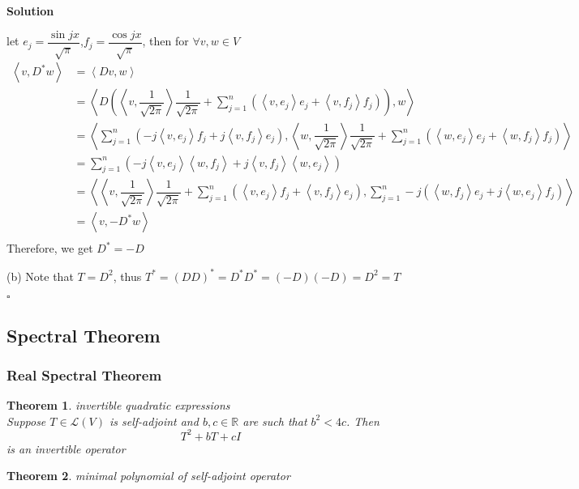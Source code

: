 \documentclass{article}
\newtheorem{theorem}{Theorem}[subsection]
\newenvironment{solution}{%
{
    \textbf{Solution\\}
    }
}{
  \hfill $\square$ 
  \par\bigskip 
}
\newcommand{\RR}{\mathbb{R}}
\newcommand{\parameter}[1]{\left(#1\right)}
\begin{document}
\begin{CJK}{UTF8}{gkai}
\begin{solution}
    let $e_j = \dfrac{\sin jx}{\sqrt{\pi}}$,$f_j = \dfrac{\cos jx}{\sqrt{\pi}}$, then for $\forall v,w \in V$
    \[\begin{aligned}
        \left<v,D^\ast w\right> &= \left<Dv, w\right>\\
        &= \left<D\parameter{\left<v,\dfrac{1}{\sqrt{2\pi}}\right>\dfrac{1}{\sqrt{2\pi}} + \sum_{j = 1}^n \parameter{\left<v,e_j\right> e_j  + \left<v,f_j\right> f_j}},w\right>\\
        &= \left<\sum_{j = 1}^n \parameter{-j \left<v,e_j\right> f_j  + j \left<v,f_j\right> e_j},\left<w,\dfrac{1}{\sqrt{2\pi}}\right>\dfrac{1}{\sqrt{2\pi}} + \sum_{j = 1}^n \parameter{\left<w,e_j\right> e_j  + \left<w,f_j\right> f_j}\right>\\
        &= \sum_{j = 1}^{n}\parameter{-j \left<v,e_j\right>\left<w,f_j\right> + j\left<v,f_j\right>\left<w,e_j\right> }\\
        &= \left<\left<v,\dfrac{1}{\sqrt{2\pi}}\right>\dfrac{1}{\sqrt{2\pi}} + \sum_{j = 1}^n \parameter{\left<v,e_j\right> f_j  +\left<v,f_j\right> e_j},\sum_{j = 1}^n - j\parameter{\left<w,f_j\right> e_j  + j\left<w,e_j\right> f_j}\right>\\
        &= \left<v,-D^\ast w\right>\\
    \end{aligned}\]
    Therefore, we get $D^\ast = - D$

    (b) Note that $T = D^2$, thus $T^\ast = (DD)^\ast = D^\ast D^\ast = (-D)(-D) = D^2 = T$
\end{solution}



\subsection{Spectral Theorem}

\subsubsection{Real Spectral Theorem}

\begin{theorem}
    invertible quadratic expressions\\

    Suppose $T \in \mathcal{L}(V)$ is self-adjoint and $b,c \in \RR$ are such that $b^2 < 4c$. Then
    \[T^2 +bT+cI\]
    is an invertible operator
\end{theorem}

\begin{theorem}
    minimal polynomial of self-adjoint operator\


\end{theorem}
\end{CJK}
\end{document}
